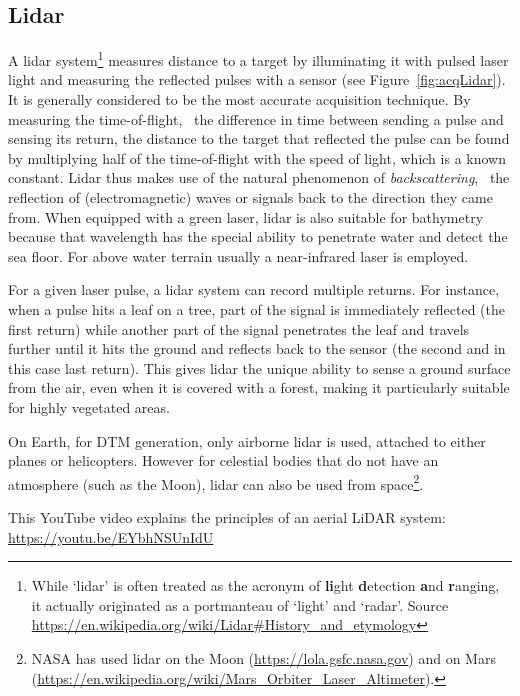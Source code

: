 \subsection{Lidar}
A lidar system\footnote{While `lidar' is often treated as the acronym of \textbf{li}ght \textbf{d}etection \textbf{a}nd \textbf{r}anging, it actually originated as a portmanteau of `light' and `radar'. Source \url{https://en.wikipedia.org/wiki/Lidar\#History\_and\_etymology}} measures distance to a target by illuminating it with pulsed laser light and measuring the reflected pulses with a sensor (see Figure~\ref{fig:acqLidar}). 
It is generally considered to be the most accurate acquisition technique.
By measuring the time-of-flight, \ie\ the difference in time between sending a pulse and sensing its return, the distance to the target that reflected the pulse can be found by multiplying half of the time-of-flight with the speed of light, which is a known constant.
Lidar thus makes use of the natural phenomenon of \emph{backscattering}, \ie\ the reflection of (electromagnetic) waves or signals back to the direction they came from. 
When equipped with a green laser, lidar is also suitable for bathymetry because that wavelength has the special ability to penetrate water and detect the sea floor. For above water terrain usually a near-infrared laser is employed.

For a given laser pulse, a lidar system can record multiple returns. 
For instance, when a pulse hits a leaf on a tree, part of the signal is immediately reflected (the first return) while another part of the signal penetrates the leaf and travels further until it hits the ground and reflects back to the sensor (the second and in this case last return).  
This gives lidar the unique ability to sense a ground surface from the air, even when it is covered with a forest, making it particularly suitable for highly vegetated areas.

On Earth, for DTM generation, only airborne lidar is used, attached to either planes or helicopters.
However for celestial bodies that do not have an atmosphere (such as the Moon), lidar can also be used from space\footnote{NASA has used lidar on the Moon (\url{https://lola.gsfc.nasa.gov}) and on Mars (\url{https://en.wikipedia.org/wiki/Mars_Orbiter_Laser_Altimeter}).}.

\begin{link-box}
This YouTube video explains the principles of an aerial LiDAR system:
\\
\url{https://youtu.be/EYbhNSUnIdU}
\end{link-box}


